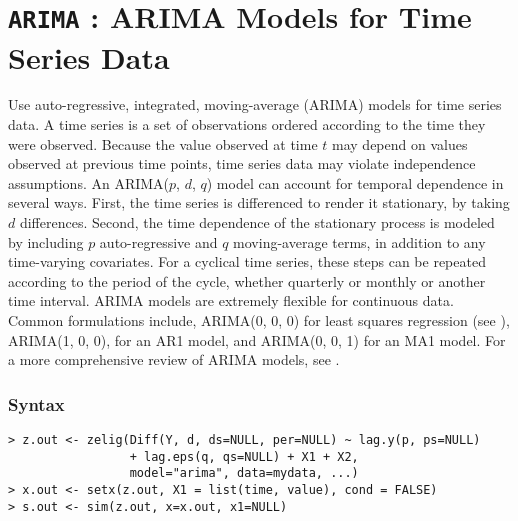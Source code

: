 \section{{\tt ARIMA} : ARIMA Models for Time Series Data}
\label{ARIMA} 

Use auto-regressive, integrated, moving-average (ARIMA) models for
time series data.  A time series is a set of observations ordered
according to the time they were observed.  Because the value observed
at time $t$ may depend on values observed at previous time points,
time series data may violate independence assumptions.  An ARIMA($p$,
$d$, $q$) model can account for temporal dependence in several ways.
First, the time series is differenced to render it stationary, by
taking $d$ differences.  Second, the time dependence of the stationary
process is modeled by including $p$ auto-regressive and $q$
moving-average terms, in addition to any time-varying covariates.  For
a cyclical time series, these steps can be repeated according to the
period of the cycle, whether quarterly or monthly or another time
interval.  ARIMA models are extremely flexible for continuous data.
Common formulations include, ARIMA(0, 0, 0) for least squares
regression (see ), ARIMA(1, 0, 0), for an AR1 model, and
ARIMA(0, 0, 1) for an MA1 model.  For a more comprehensive review of
ARIMA models, see \cite{Enders04}.
  
\subsubsection*{Syntax}
\begin{verbatim}
> z.out <- zelig(Diff(Y, d, ds=NULL, per=NULL) ~ lag.y(p, ps=NULL) 
                 + lag.eps(q, qs=NULL) + X1 + X2, 
                 model="arima", data=mydata, ...)
> x.out <- setx(z.out, X1 = list(time, value), cond = FALSE) 
> s.out <- sim(z.out, x=x.out, x1=NULL)
\end{verbatim}

